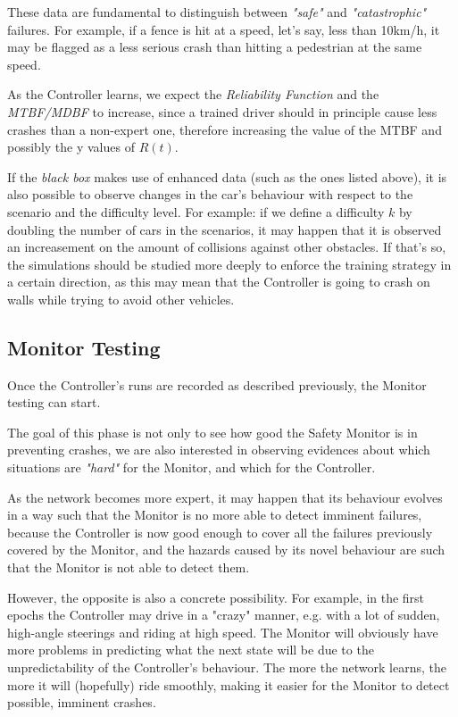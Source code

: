 These data are fundamental to distinguish between \textsl{"safe"} and \textsl{"catastrophic"} failures. For example, if a fence is hit at a speed, let's say, less than 10km/h, it may be flagged as a less serious crash than hitting a pedestrian at the same speed.

As the Controller learns, we expect the \textsl{Reliability Function} and the \textsl{MTBF/MDBF} to increase, since a trained driver should in principle cause less crashes than a non-expert one, therefore increasing the value of the MTBF and possibly the y values of $R(t)$.

If the \textsl{black box} makes use of enhanced data (such as the ones listed above), it is also possible to observe changes in the car's behaviour with respect to the scenario and the difficulty level. For example: if we define a difficulty $k$ by doubling the number of cars in the scenarios, it may happen that it is observed an increasement on the amount of collisions against other obstacles. If that's so, the simulations should be studied more deeply to enforce the training strategy in a certain direction, as this may mean that the Controller is going to crash on walls while trying to avoid other vehicles.


\subsection{Monitor Testing}

Once the Controller's runs are recorded as described previously, the Monitor testing can start.

The goal of this phase is not only to see how good the Safety Monitor is in preventing crashes, we are also interested in observing evidences about which situations are \textsl{"hard"} for the Monitor, and which for the Controller. 

As the network becomes more expert, it may happen that its behaviour evolves in a way such that the Monitor is no more able to detect imminent failures, because the Controller is now good enough to cover all the failures previously covered by the Monitor, and the hazards caused by its novel behaviour are such that the Monitor is not able to detect them.

However, the opposite is also a concrete possibility. For example, in the first epochs the Controller may drive in a "crazy" manner, e.g. with a lot of sudden, high-angle steerings and riding at high speed. The Monitor will obviously have more problems in predicting what the next state will be due to the unpredictability of the Controller's behaviour. The more the network learns, the more it will (hopefully) ride smoothly, making it easier for the Monitor to detect possible, imminent crashes.

